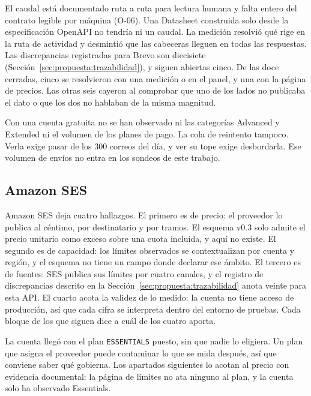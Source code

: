 El caudal está documentado ruta a ruta para lectura humana y falta entero
del contrato legible por máquina (O-06). Una Datasheet construida solo desde la
especificación OpenAPI no tendría ni un caudal. La medición resolvió qué
rige en la ruta de actividad y desmintió que las cabeceras lleguen en todas
las respuestas. Las discrepancias registradas para Brevo son diecisiete (Sección~\ref{sec:propuesta:trazabilidad}), y siguen abiertas cinco.
De las doce cerradas, cinco se resolvieron con una medición o en el panel, y una con la página de precios.
Las otras seis cayeron al comprobar que uno de los lados no publicaba el dato o que los dos no hablaban de la misma magnitud.

Con una cuenta gratuita no se han
observado ni las categorías Advanced y Extended ni el volumen de los planes de
pago. La cola de reintento tampoco. Verla exige pasar de los 300 correos del
día, y ver su tope exige desbordarla. Ese volumen de envíos no entra en los
sondeos de este trabajo.

\subsection{Amazon SES}
\label{subsec:hallazgos:ses}

Amazon SES \citep{sespricing,sesdocs} deja cuatro hallazgos. El primero es de
precio: el proveedor lo publica al céntimo, por destinatario y por tramos. El
esquema v0.3 solo admite el precio unitario como exceso sobre una cuota
incluida, y aquí no existe. El segundo es de capacidad: los límites observados se contextualizan por cuenta y
región, y el esquema no tiene un campo donde declarar ese ámbito. El tercero es
de fuentes: SES publica sus límites por cuatro canales, y el registro de
discrepancias descrito en la Sección~\ref{sec:propuesta:trazabilidad} anota
veinte para esta API. El cuarto acota la validez de lo medido: la cuenta no tiene acceso de
producción, así que cada cifra se interpreta dentro del entorno de pruebas.
Cada bloque de los que siguen dice a cuál de los cuatro aporta.

La cuenta llegó con el plan \texttt{ESSENTIALS} puesto, sin que nadie lo
eligiera. Un plan que asigna el proveedor puede contaminar lo que se mida
después, así que conviene saber qué gobierna. Los apartados siguientes lo
acotan al precio con evidencia documental: la página de límites no ata
ninguno al plan, y la cuenta solo ha observado Essentials.

